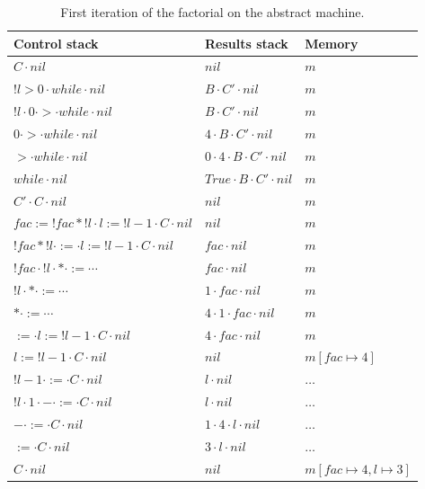 \begin{table}[h]
\centering
\small
\begin{tabular}{l l l}
  \toprule
  Control stack & Results stack & Memory \\
  \midrule
  $C \cdot \mathit{nil}$                       & $\mathit{nil}$                     & $m$ \\
  $!l > 0 \cdot \mathit{while} \cdot \mathit{nil}$ & $B \cdot C' \cdot \mathit{nil}$ & $m$ \\
  $!l \cdot 0 \cdot {>} \cdot \mathit{while} \cdot \mathit{nil}$ & $B \cdot C' \cdot \mathit{nil}$ & $m$ \\
  $0 \cdot {>} \cdot \mathit{while} \cdot \mathit{nil}$ & $4 \cdot B \cdot C' \cdot \mathit{nil}$ & $m$ \\
  ${>} \cdot \mathit{while} \cdot \mathit{nil}$ & $0 \cdot 4 \cdot B \cdot C' \cdot \mathit{nil}$ & $m$ \\
  $\mathit{while} \cdot \mathit{nil}$           & $\mathit{True} \cdot B \cdot C' \cdot \mathit{nil}$ & $m$ \\
  $C' \cdot C \cdot \mathit{nil}$               & $\mathit{nil}$                     & $m$ \\
  $\mathit{fac} := !\mathit{fac} * !l \cdot l := !l - 1 \cdot C \cdot \mathit{nil}$ & $\mathit{nil}$ & $m$ \\
  $!\mathit{fac} * !l \cdot {:=} \cdot l := !l - 1 \cdot C \cdot \mathit{nil}$ & $\mathit{fac} \cdot \mathit{nil}$ & $m$ \\
  $!\mathit{fac} \cdot !l \cdot * \cdot {:=} \cdots$ & $\mathit{fac} \cdot \mathit{nil}$ & $m$ \\
  $!l \cdot * \cdot {:=} \cdots$                & $1 \cdot \mathit{fac} \cdot \mathit{nil}$ & $m$ \\
  $* \cdot {:=} \cdots$                         & $4 \cdot 1 \cdot \mathit{fac} \cdot \mathit{nil}$ & $m$ \\
  ${:=} \cdot l := !l - 1 \cdot C \cdot \mathit{nil}$ & $4 \cdot \mathit{fac} \cdot \mathit{nil}$ & $m$ \\
  $l := !l - 1 \cdot C \cdot \mathit{nil}$      & $\mathit{nil}$ & $m[\mathit{fac} \mapsto 4]$ \\
  $!l - 1 \cdot {:=} \cdot C \cdot \mathit{nil}$ & $l \cdot \mathit{nil}$ & $\dots$ \\
  $!l \cdot 1 \cdot - \cdot {:=} \cdot C \cdot \mathit{nil}$ & $l \cdot \mathit{nil}$ & $\dots$ \\
  $- \cdot {:=} \cdot C \cdot \mathit{nil}$     & $1 \cdot 4 \cdot l \cdot \mathit{nil}$ & $\dots$ \\
  ${:=} \cdot C \cdot \mathit{nil}$             & $3 \cdot l \cdot \mathit{nil}$ & $\dots$ \\
  $C \cdot \mathit{nil}$                        & $\mathit{nil}$ & $m[\mathit{fac} \mapsto 4, l \mapsto 3]$ \\
  \bottomrule
\end{tabular}
\caption{First iteration of the factorial on the abstract machine.}
\label{tab:machine-fac}
\end{table}

